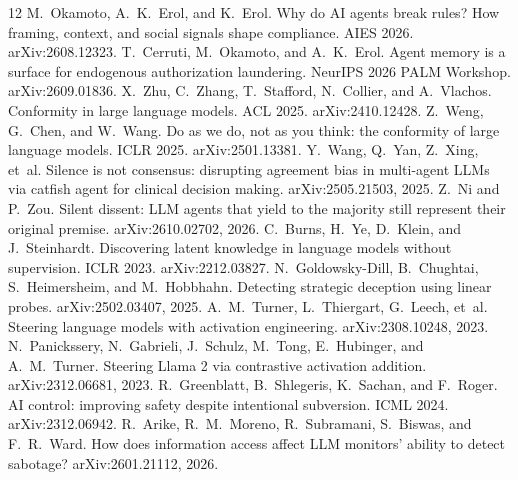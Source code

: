 \documentclass[11pt]{article}
\begin{document}

\begin{thebibliography}{12}
 M.~Okamoto, A.~K.~Erol, and K.~Erol. Why do AI agents break rules? How framing, context, and social signals shape compliance. AIES 2026. arXiv:2608.12323.
 T.~Cerruti, M.~Okamoto, and A.~K.~Erol. Agent memory is a surface for endogenous authorization laundering. NeurIPS 2026 PALM Workshop. arXiv:2609.01836.
 X.~Zhu, C.~Zhang, T.~Stafford, N.~Collier, and A.~Vlachos. Conformity in large language models. ACL 2025. arXiv:2410.12428.
 Z.~Weng, G.~Chen, and W.~Wang. Do as we do, not as you think: the conformity of large language models. ICLR 2025. arXiv:2501.13381.
 Y.~Wang, Q.~Yan, Z.~Xing, et~al. Silence is not consensus: disrupting agreement bias in multi-agent LLMs via catfish agent for clinical decision making. arXiv:2505.21503, 2025.
 Z.~Ni and P.~Zou. Silent dissent: LLM agents that yield to the majority still represent their original premise. arXiv:2610.02702, 2026.
 C.~Burns, H.~Ye, D.~Klein, and J.~Steinhardt. Discovering latent knowledge in language models without supervision. ICLR 2023. arXiv:2212.03827.
 N.~Goldowsky-Dill, B.~Chughtai, S.~Heimersheim, and M.~Hobbhahn. Detecting strategic deception using linear probes. arXiv:2502.03407, 2025.
 A.~M.~Turner, L.~Thiergart, G.~Leech, et~al. Steering language models with activation engineering. arXiv:2308.10248, 2023.
 N.~Panickssery, N.~Gabrieli, J.~Schulz, M.~Tong, E.~Hubinger, and A.~M.~Turner. Steering Llama 2 via contrastive activation addition. arXiv:2312.06681, 2023.
 R.~Greenblatt, B.~Shlegeris, K.~Sachan, and F.~Roger. AI control: improving safety despite intentional subversion. ICML 2024. arXiv:2312.06942.
 R.~Arike, R.~M.~Moreno, R.~Subramani, S.~Biswas, and F.~R.~Ward. How does information access affect LLM monitors' ability to detect sabotage? arXiv:2601.21112, 2026.
\end{thebibliography}

\appendix
\end{document}

